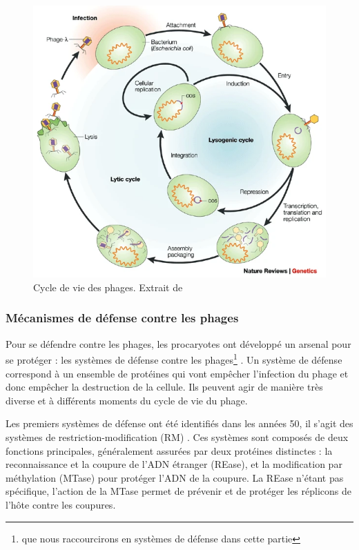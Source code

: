 \begin{figure}
    \centering
    \includegraphics[width=0.75\linewidth]{images/cycle_phages.png}
    \caption[Cycle de vie des phages]{Cycle de vie des phages. Extrait de \cite{campbell_future_2003}}
    \label{fig:cycle_phage}
\end{figure}

\newpage
\subsubsection{Mécanismes de défense contre les phages}

Pour se défendre contre les phages, les procaryotes ont  développé un arsenal pour se protéger : les systèmes de défense contre les phages\footnote{que nous raccourcirons en systèmes de défense dans cette partie} \cite{makarova_comparative_2013}. Un système de défense correspond à un ensemble de protéines qui vont empêcher l'infection du phage et donc empêcher la destruction de la cellule. Ils peuvent agir de manière très diverse et à différents moments du cycle de vie du phage. 


Les premiers systèmes de défense ont été identifiés dans les années 50, il s'agit des systèmes de restriction-modification (RM) \cite{bertani_host_1953}. Ces systèmes sont composés de deux fonctions principales, généralement assurées par deux protéines distinctes : la reconnaissance et la coupure de l'ADN étranger (REase), et la modification par méthylation (MTase) pour protéger l'ADN de la coupure. La REase n'étant pas spécifique, l'action de la MTase permet de prévenir et de protéger les réplicons de l'hôte contre les coupures.

